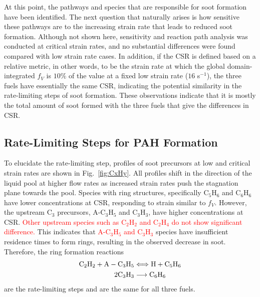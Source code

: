 \documentclass[review,3p,times]{elsarticleUS}
\begin{document}
At this point, the pathways and species that are responsible for soot formation have been identified. The next question that naturally arises is how sensitive these pathways are to the increasing strain rate that leads to reduced soot formation. Although not shown here, sensitivity and reaction path analysis was conducted at critical strain rates, and no substantial differences were found compared with low strain rate cases. In addition, if the CSR is defined based on a relative metric, in other words, to be the strain rate at which the global domain-integrated $f_V$ is $10\%$ of the value at a fixed low strain rate ($16$ s$^{-1}$), the three fuels have essentially the same CSR, indicating the potential similarity in the rate-limiting steps of soot formation. These observations indicate that it is mostly the total amount of soot formed with the three fuels that give the differences in CSR.


\subsection{Rate-Limiting Steps for PAH Formation}

To elucidate the rate-limiting step, profiles of soot precursors at low and critical strain rates are shown in Fig.~\ref{fig:CxHy}. All profiles shift in the direction of the liquid pool at higher flow rates as increased strain rates push the stagnation plane towards the pool. Species with ring structures, specifically C$_5$H$_6$ and C$_6$H$_6$ have lower concentrations at CSR, responding to strain similar to $f_V$. However, the upstream C$_3$ precursors, A-C$_3$H$_5$ and C$_3$H$_3$, have higher concentrations at CSR. \textcolor{red}{Other upstream species such as C$_2$H$_2$ and C$_2$H$_4$ do not show significant difference.}  This indicates that \textcolor{red}{A-C$_3$H$_5$ and C$_3$H$_3$} species have insufficient residence times to form rings, resulting in the observed decrease in soot. Therefore, the ring formation reactions
\begin{align*}
  {\rm C}_2{\rm H}_2 + {\rm A}-{\rm C}_3{\rm H}_5 &\Longleftrightarrow {\rm H} + {\rm C}_5{\rm H}_6\\
  2 {\rm C}_3{\rm H}_3 &\longrightarrow {\rm C}_6{\rm H}_6
\end{align*}
are the rate-limiting steps and are the same for all three fuels.
\end{document}
